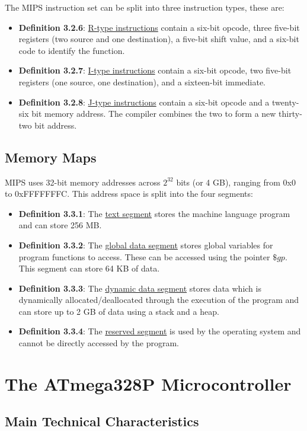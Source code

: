 \documentclass{article}
\newcommand{\separate}[1] {\vspace{#1 pt}\noindent}
\newcommand{\definition}[2]{\textbf{Definition #1}: #2\label{def:#1}}
\begin{document}
\separate{5}The MIPS instruction set can be split into three instruction types, these are:
\begin{itemize}
    \item \definition{3.2.6}{\underline{R-type instructions} contain a six-bit opcode, three five-bit registers (two source and one destination), a five-bit shift value, and a six-bit code to identify the function.}
    \item \definition{3.2.7}{\underline{I-type instructions} contain a six-bit opcode, two five-bit registers (one source, one destination), and a sixteen-bit immediate.}
    \item \definition{3.2.8}{\underline{J-type instructions} contain a six-bit opcode and a twenty-six bit memory address. The compiler combines the two to form a new thirty-two bit address.}
\end{itemize}

\subsection{Memory Maps}

MIPS uses 32-bit memory addresses across \(2^32\) bits (or 4 GB), ranging from 0x0 to 0xFFFFFFFC. This address space is split into the four segments:
\begin{itemize}
    \item \definition{3.3.1}{The \underline{text segment} stores the machine language program and can store 256 MB.}
    \item \definition{3.3.2}{The \underline{global data segment} stores global variables for program functions to access. These can be accessed using the pointer \(\$gp\). This segment can store 64 KB of data.}
    \item \definition{3.3.3}{The \underline{dynamic data segment} stores data which is dynamically allocated/deallocated through the execution of the program and can store up to 2 GB of data using a stack and a heap.}
    \item \definition{3.3.4}{The \underline{reserved segment} is used by the operating system and cannot be directly accessed by the program.}
\end{itemize} 

\section{The ATmega328P Microcontroller}

\subsection{Main Technical Characteristics}
\end{document}
